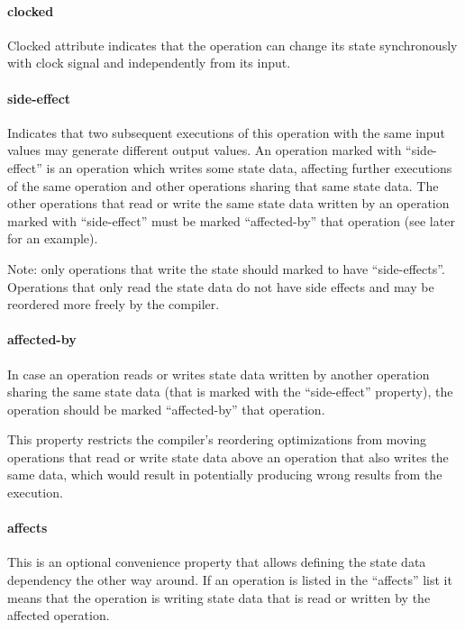 \documentclass[twoside]{tceusermanual}
\begin{document}
\paragraph{clocked}
Clocked attribute indicates that the operation can change its state
synchronously with clock signal and independently from its input.

\paragraph{side-effect}

Indicates that two subsequent executions of this operation with the same
input values may generate different output values.  An operation marked with
``side-effect'' is an operation which writes some state data, affecting
further executions of the same operation and other operations sharing
that same state data. The other operations that read or write
the same state data written by an operation marked with ``side-effect'' 
must be marked ``affected-by'' that operation (see later for an example).

Note: only operations that write the state should marked to
have ``side-effects''. Operations that only read the state data do not
have side effects and may be reordered more freely by the compiler.

\paragraph{affected-by}

In case an operation reads or writes state data written by another 
operation sharing the same state data (that is marked with the
``side-effect'' property), the operation should be marked ``affected-by''
that operation. 

This property restricts the compiler's reordering optimizations 
from moving operations that read or write state data above an operation
that also writes the same data, which would result in potentially
producing wrong results from the execution.

\paragraph{affects}

This is an optional convenience property that allows defining
the state data dependency the other way around. If an operation
is listed in the ``affects'' list it means that the operation
is writing state data that is read or written by the affected operation.
\end{document}
